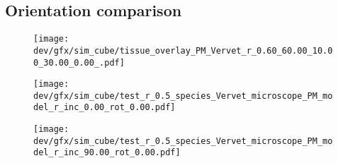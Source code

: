 \subsection{Orientation comparison}
% 
\begin{figure}[!tp]
\centering
\texttt{[image: dev/gfx/sim\_cube/tissue\_overlay\_PM\_Vervet\_r\_0.60\_60.00\_10.00\_30.00\_0.00\_.pdf]} 
\caption[sim]{\dummy{}}
\label{fig:sim_fyjsrg}
\end{figure}
% 
% 
% 
% 
\begin{figure}[!tp]
\centering
\texttt{[image: dev/gfx/sim\_cube/test\_r\_0.5\_species\_Vervet\_microscope\_PM\_model\_r\_inc\_0.00\_rot\_0.00.pdf]} 
\caption[sim]{\dummy{}}
\label{fig:sim_matrix_0}
\end{figure}
% 
% 
% 
% 
\begin{figure}[!tp]
\centering
\texttt{[image: dev/gfx/sim\_cube/test\_r\_0.5\_species\_Vervet\_microscope\_PM\_model\_r\_inc\_90.00\_rot\_0.00.pdf]} 
\caption[sim]{\dummy{}}
\label{fig:sim_matrix_90}
\end{figure}
% 
% 
% 

